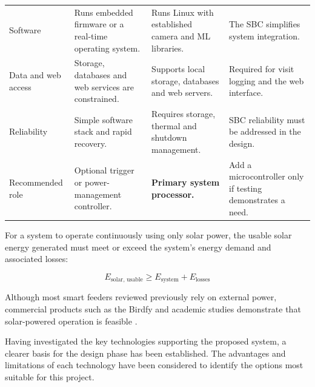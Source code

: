 \begin{table}[htbp]
\begin{tabularx}{\textwidth}{
        >{\raggedright\arraybackslash}p{}
        >{\raggedright\arraybackslash}X
        >{\raggedright\arraybackslash}X
        >{\raggedright\arraybackslash}p{}
    }
        \addlinespace

        Software
        & Runs embedded firmware or a real-time operating system.
        & Runs Linux with established camera and ML libraries.
        & The SBC simplifies system integration. \\

        \addlinespace

        Data and web access
        & Storage, databases and web services are constrained.
        & Supports local storage, databases and web servers.
        & Required for visit logging and the web interface. \\

        \addlinespace

        Reliability
        & Simple software stack and rapid recovery.
        & Requires storage, thermal and shutdown management.
        & SBC reliability must be addressed in the design. \\

        \midrule

        Recommended role
        & Optional trigger or power-management controller.
        & \textbf{Primary system processor.}
        & Add a microcontroller only if testing demonstrates a need. \\

        \bottomrule
    \end{tabularx}

    \vspace{0.4em}
\end{table}

For a system to operate continuously using only solar power, the usable solar energy generated must meet or exceed the system's energy demand and associated losses:

$$
E_{\text{solar, usable}} \geq E_{\text{system}} + E_{\text{losses}}
$$

\par\vspace{6pt}
Although most smart feeders reviewed previously rely on external power, commercial products such as the Birdfy and academic studies demonstrate that solar-powered operation is feasible \cite{BirdfyHumFeeder,PouRossellEtAl2025}.
\par\vspace{6pt}
Having investigated the key technologies supporting the proposed system, a clearer basis for the design phase has been established. The advantages and limitations of each technology have been considered to identify the options most suitable for this project.

